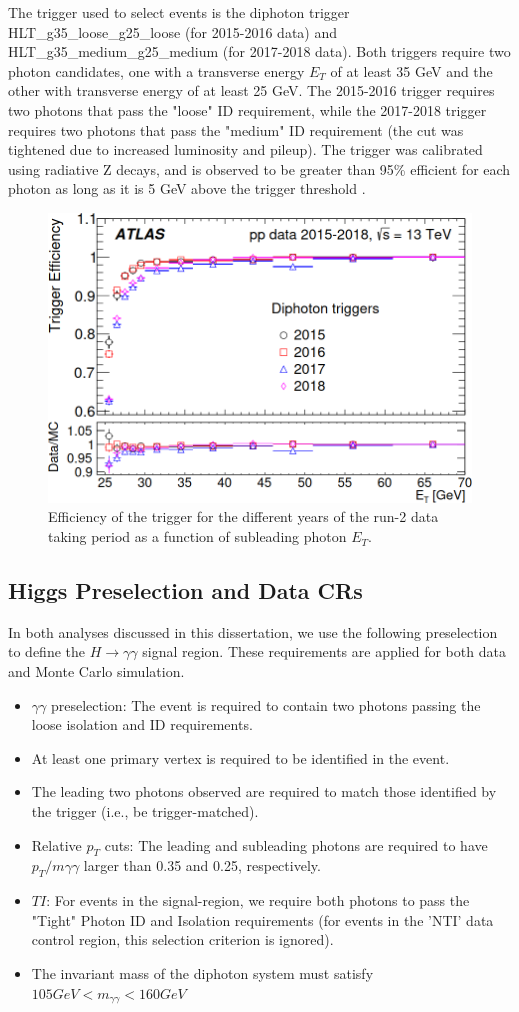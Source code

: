 The trigger used to select events is the diphoton trigger HLT\_g35\_loose\_g25\_loose (for 2015-2016 data) and HLT\_g35\_medium\_g25\_medium (for 2017-2018 data). Both triggers require two photon candidates, one with a transverse energy $E_{T}$ of at least 35 GeV and the other with transverse energy of at least 25 GeV. The 2015-2016 trigger requires two photons that pass the "loose" ID requirement, while the 2017-2018 trigger requires two photons that pass the "medium" ID requirement (the cut was tightened due to increased luminosity and pileup). The trigger was calibrated using radiative Z decays, and is observed to be greater than 95\% efficient for each photon as long as it is 5 GeV above the trigger threshold \cite{triggerperformance}.

\begin{figure}
\centering
\includegraphics[width=0.5\linewidth]{figures/datamc_chapter/trigger.png}
\caption{Efficiency of the trigger for the different years of the run-2 data taking period as a function of subleading photon $E_{T}$.}
\end{figure}

\subsection{Higgs Preselection and Data CRs} \label{sec:Preselection} 

In both analyses discussed in this dissertation, we use the following preselection to define the $H \rightarrow \gamma \gamma$ signal region. These requirements are applied for both data and Monte Carlo simulation. 

\begin{itemize}
\item $\gamma\gamma$ preselection: The event is required to contain two photons passing the loose isolation and ID requirements.
\item At least one primary vertex is required to be identified in the event.
\item The leading two photons observed are required to match those identified by the trigger (i.e., be trigger-matched).
\item Relative $p_{T}$ cuts: The leading and subleading photons are required to have $p_{T}/m\gamma\gamma$ larger than 0.35 and 0.25, respectively.
\item $TI$: For events in the signal-region, we require both photons to pass the "Tight" Photon ID and Isolation requirements (for events in the 'NTI' data control region, this selection criterion is ignored). 
\item The invariant mass of the diphoton system must satisfy $105 GeV < m_{\gamma\gamma} < 160 GeV$
\end{itemize}

